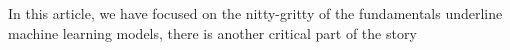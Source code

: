 In this article, we have focused on the nitty-gritty of the fundamentals underline machine learning models, there is another critical part of the story